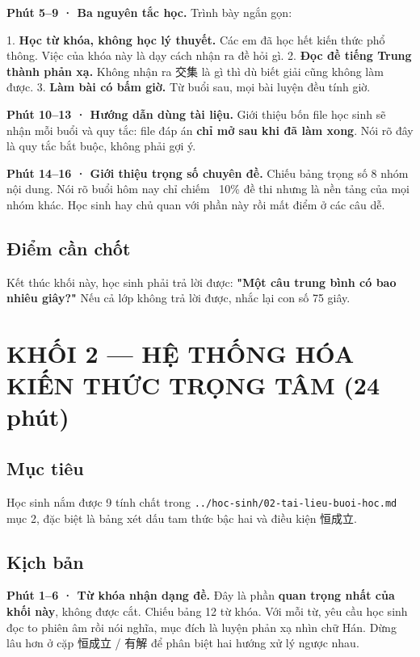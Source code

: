 \documentclass[11pt, a4paper]{article}
\begin{document}
\textbf{Phút 5–9 · Ba nguyên tắc học.} Trình bày ngắn gọn:

1. \textbf{Học từ khóa, không học lý thuyết.} Các em đã học hết kiến thức phổ thông. Việc của khóa này là dạy cách nhận ra đề hỏi gì.
2. \textbf{Đọc đề tiếng Trung thành phản xạ.} Không nhận ra 交集 là gì thì dù biết giải cũng không làm được.
3. \textbf{Làm bài có bấm giờ.} Từ buổi sau, mọi bài luyện đều tính giờ.

\textbf{Phút 10–13 · Hướng dẫn dùng tài liệu.} Giới thiệu bốn file học sinh sẽ nhận mỗi buổi và quy tắc: file đáp án \textbf{chỉ mở sau khi đã làm xong}. Nói rõ đây là quy tắc bắt buộc, không phải gợi ý.

\textbf{Phút 14–16 · Giới thiệu trọng số chuyên đề.} Chiếu bảng trọng số 8 nhóm nội dung. Nói rõ buổi hôm nay chỉ chiếm ~10\% đề thi nhưng là nền tảng của mọi nhóm khác. Học sinh hay chủ quan với phần này rồi mất điểm ở các câu dễ.

\subsection{Điểm cần chốt}

Kết thúc khối này, học sinh phải trả lời được: \textbf{"Một câu trung bình có bao nhiêu giây?"} Nếu cả lớp không trả lời được, nhắc lại con số 75 giây.

\section{KHỐI 2 — HỆ THỐNG HÓA KIẾN THỨC TRỌNG TÂM (24 phút)}

\subsection{Mục tiêu}

Học sinh nắm được 9 tính chất trong \texttt{../hoc-sinh/02-tai-lieu-buoi-hoc.md} mục 2, đặc biệt là bảng xét dấu tam thức bậc hai và điều kiện 恒成立.

\subsection{Kịch bản}

\textbf{Phút 1–6 · Từ khóa nhận dạng đề.} Đây là phần \textbf{quan trọng nhất của khối này}, không được cắt. Chiếu bảng 12 từ khóa. Với mỗi từ, yêu cầu học sinh đọc to phiên âm rồi nói nghĩa, mục đích là luyện phản xạ nhìn chữ Hán. Dừng lâu hơn ở cặp 恒成立 / 有解 để phân biệt hai hướng xử lý ngược nhau.
\end{document}
